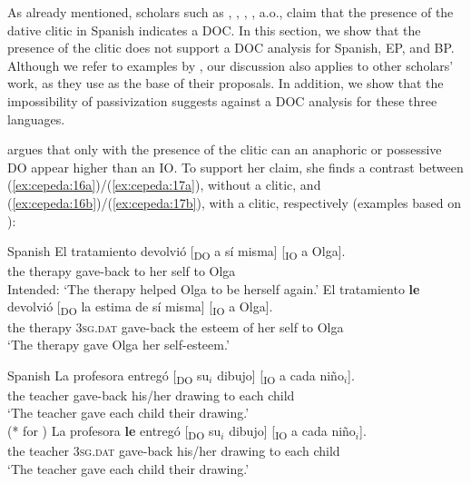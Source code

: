 \documentclass[output=paper,colorlinks,citecolor=brown,modfonts,nonflat]{langsci/langscibook}
\begin{document}
As already mentioned, scholars such as \citet{Demonte1995}, \citet{Bleam2003}, \citet{Cuervo2003}, \citet{Cuervo2010Proceedings}, a.o., claim that the presence of the dative clitic in Spanish indicates a DOC. In this section, we show that the presence of the clitic does not support a DOC analysis for Spanish, EP, and BP. Although we refer to examples by \citet{Demonte1995}, our discussion also applies to other scholars’ work, as they use \citet{Demonte1995} as the base of their proposals. In addition, we show that the impossibility of passivization suggests against a DOC analysis for these three languages.

\citet{Demonte1995} argues that only with the presence of the clitic can an anaphoric or possessive DO appear higher than an IO. To support her claim, she finds a contrast between (\ref{ex:cepeda:16a})/(\ref{ex:cepeda:17a}), without a clitic, and (\ref{ex:cepeda:16b})/(\ref{ex:cepeda:17b}), with a clitic, respectively (examples based on \citeauthor{Demonte1995}):

\newpage

\ea%
    \label{ex:cepeda:16} Spanish
	\ea\label{ex:cepeda:16a}
	\gll El tratamiento devolvió [\textsubscript{DO} a sí  misma] [\textsubscript{IO} a Olga].\\
		the therapy      gave-back \hspaceThis{[\textsubscript{DO}} to her self \hspaceThis{[\textsubscript{IO}} to Olga\\
	\glt Intended: ‘The therapy helped Olga to be herself again.’
	\ex\label{ex:cepeda:16b}
	\gll El tratamiento \textbf{le} devolvió [\textsubscript{DO} la estima  de sí  misma] [\textsubscript{IO} a Olga].\\
		the therapy \textsc{3sg.dat} gave-back \hspaceThis{[\textsubscript{DO}} the esteem of her self \hspaceThis{[\textsubscript{IO}} to Olga\\
	\glt ‘The therapy gave Olga her self-esteem.’
	\z
\z

\ea%
    \label{ex:cepeda:17}
    Spanish
	\ea\label{ex:cepeda:17a}
	\gll La  profesora entregó [\textsubscript{DO} su$_i$ dibujo] [\textsubscript{IO} a  cada  niño$_i$].\\
		the teacher gave-back \hspaceThis{[\textsubscript{DO}} his/her drawing \hspaceThis{[\textsubscript{IO}} to each child\\
	\glt ‘The teacher gave each child their drawing.’\\
			(* for \citeauthor{Demonte1995})
	\ex\label{ex:cepeda:17b}
	\gll  La  profesora \textbf{le} entregó [\textsubscript{DO} su$_i$ dibujo] [\textsubscript{IO} a  cada  niño$_i$].\\
		the teacher \textsc{3sg.dat}  gave-back \hspaceThis{[\textsubscript{DO}} his/her drawing \hspaceThis{[\textsubscript{IO}} to each child\\
	\glt ‘The teacher gave each child their drawing.’
	\z
\z
\end{document}
